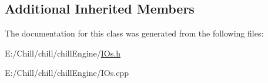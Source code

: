 \subsection*{Additional Inherited Members}


The documentation for this class was generated from the following files\+:\begin{DoxyCompactItemize}
\item 
E\+:/\+Chill/chill/chill\+Engine/\mbox{\hyperlink{_i_os_8h}{I\+Os.\+h}}\item 
E\+:/\+Chill/chill/chill\+Engine/I\+Os.\+cpp\end{DoxyCompactItemize}
